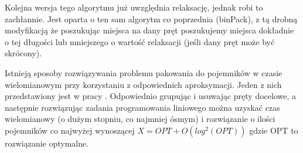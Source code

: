 Kolejna wersja tego algorytmu już uwzględnia relaksację, jednak robi to zachłannie. Jest oparta o ten sam algorytm co poprzednia (binPack), z tą drobną modyfikacją że poszukując miejsca na dany pręt poszukujemy miejsca dokładnie o tej długości lub mniejszego o wartość relaksacji (jeśli dany pręt może być skrócony).

Istnieją sposoby rozwiązywania problemu pakowania do pojemników w czasie wielomianowym przy korzystaniu z odpowiednich aproksymacji. Jeden z nich przedstawiony jest w pracy \cite{bin-packing}. Odpowiednio grupując i usuwając pręty docelowe, a następnie rozwiązując zadania programowania liniowego można uzyskać czas wielomianowy (o dużym stopniu, co najmniej ósmym) i rozwiązanie o ilości pojemników co najwyżej wynoszącej $X = OPT + O(log^2(OPT))$ gdzie OPT to rozwiązanie optymalne.










